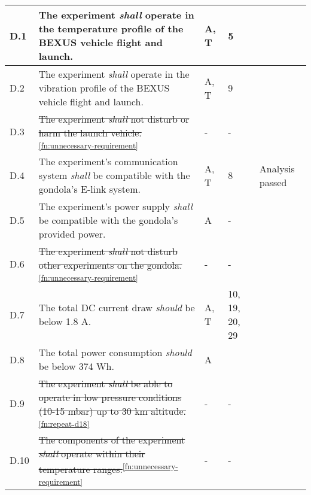\begin{longtable}[]{|m{}| m{} |m{} |m{}|m{}|}
D.1  & The experiment \textit{shall} operate in the temperature profile of the BEXUS vehicle flight and launch.                                                                         &       A, T       & 5            &        \\ \hline
D.2  & The experiment \textit{shall} operate in the vibration profile of the BEXUS vehicle flight and launch.                                                                           &       A, T       & 9            &        \\ \hline
D.3  & \st{The experiment \textit{shall} not disturb or harm the launch vehicle.}\textsuperscript{\ref{fn:unnecessary-requirement}}                                                                                                             &      -      & -          &        \\ \hline
D.4  & The experiment's communication system \textit{shall} be compatible with the gondola's E-link system.                                                                             &      A, T        & 8            &    Analysis passed    \\ \hline
D.5  & The experiment's power supply \textit{shall
} be compatible with the gondola's provided power.                                                                                    &      A       &  -           &        \\ \hline
D.6  & \st{The experiment \textit{shall} not disturb other experiments on the gondola.}\textsuperscript{\ref{fn:unnecessary-requirement}}                                                                                                       &      -      & -           &        \\ \hline
D.7  & The total DC current draw \textit{should} be below 1.8 A.                                                                                                                        &      A, T        & 10, 19, 20, 29            &        \\ \hline
D.8  & The total power consumption \textit{should} be below 374 Wh.                                                                                                                      &       A       &            &        \\ \hline
D.9  & \st{The experiment \textit{shall} be able to operate in low pressure conditions (10-15 mbar) up to 30 km altitude.}\textsuperscript{\ref{fn:repeat-d18}} &- &  - &        \\ \hline
D.10 & \st{The components of the experiment \textit{shall} operate within their temperature ranges.}\textsuperscript{\ref{fn:unnecessary-requirement}}                                                                                          &       -     & -           &        \\  \hline

\end{longtable}
